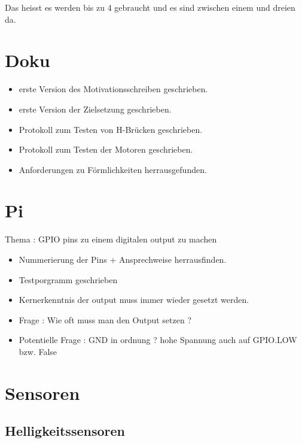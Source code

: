 \documentclass{article}
\begin{document}
Das heisst es werden bis zu 4 gebraucht und es sind zwischen einem und dreien da.
\section{Doku}

\begin{itemize}

\item erste Version des Motivationsschreiben geschrieben.

\item erste Version der Zielsetzung geschrieben.

\item Protokoll zum Testen von  H-Br\"{u}cken geschrieben.

\item Protokoll zum Testen der Motoren geschrieben.

\item Anforderungen zu F\"{o}rmlichkeiten herrausgefunden.

\end{itemize}

\section{Pi}

Thema : GPIO pins zu einem digitalen output zu machen

\begin{itemize}

\item Nummerierung der Pins + Ansprechweise herrausfinden.

\item Testporgramm geschrieben

\item Kernerkenntnis der output muss immer wieder gesetzt werden.

\item Frage : Wie oft muss man den Output setzen ? 

\item Potentielle Frage : GND in ordnung ? hohe Spannung auch auf GPIO.LOW bzw. False


\end{itemize}

\section{Sensoren}

\subsection{Helligkeitssensoren}
\end{document}
